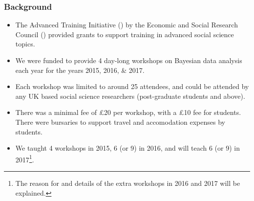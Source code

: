 \begin{frame}
	\frametitle{Background}

	\begin{itemize}

		\item The Advanced Training Initiative (\ati) by the Economic
			and Social Research Council (\esrc) provided grants to
			support training in advanced social science topics.

		\item We were funded to provide 4 day-long workshops on Bayesian data analysis each year for the years 2015, 2016, \& 2017.

		\item Each workshop was limited to around 25 attendees, and could be attended by any UK based social science researchers (post-graduate students and above).

		\item There was a minimal fee of \pounds20 per workshop, with a \pounds10 fee for students. There were bursaries to support travel and accomodation expenses by students.

		\item We taught 4 workshops in 2015, 6 (or 9) in 2016, and will teach 6 (or 9) in 2017\footnote{The reason for and details of the extra workshops in 2016 and 2017 will be explained.}.

	\end{itemize}

\end{frame}
